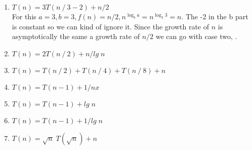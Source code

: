 \documentclass{article}
\begin{document}
\begin{enumerate}
\begin{enumerate}
      \item $T(n) = 3T(n \mathbin{/} 3 - 2) + n/2$ \\
      For this $a = 3, b = 3, f(n) = n/2, n^{\log_b a} = n^{\log_3 3} = n$. The -2 in the b part is constant so we can kind of ignore it. 
      Since the growth rate of $n$ is asymptotically the same a growth rate of $n/2$ we can go with case two,
      .

      \item $T(n) = 2T(n \mathbin{/} 2) + n/lg\;n$
      \item $T(n) = T(n \mathbin{/} 2) + T(n \mathbin{/} 4) + T(n \mathbin{/} 8) + n$
      \item $T(n) = T(n - 1) + 1/nx$
      \item $T(n) = T(n - 1) + lg\;n$
      \item $T(n) = T(n - 1) + 1/lg\;n$
      \item $T(n) = \sqrt{n}\;T(\sqrt{n}) + n$

    \end{enumerate}
    
  \end{enumerate}
\end{document}
